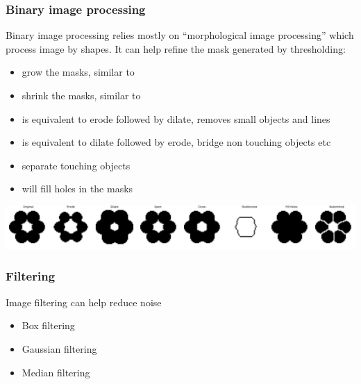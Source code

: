 \documentclass[ignorenonframetext,aspectratio=169,10pt,xcolor=table]{beamer}
\begin{document}
\begin{frame} \frametitle{Binary image processing} Binary image
  processing relies mostly on ``morphological image processing'' which
  process image by shapes. It can help refine the mask generated by
  thresholding:
  \begin{itemize}
  \item {} grow the masks, similar to
  \item {} shrink the masks, similar to
  \item {} is equivalent to erode followed by
    dilate, removes small objects and lines
  \item {} is equivalent to dilate followed
    by erode, bridge non touching objects etc
  \item {} separate touching objects
  \item {} will fill holes in the masks
  \end{itemize}
  \begin{center} \includegraphics[width=\textwidth]{flower}
  \end{center}
\end{frame}

\begin{frame} \frametitle{Filtering} Image filtering can help reduce
  noise
  \begin{itemize}
  \item Box filtering 
  \item Gaussian filtering 
  \item Median filtering 
  \end{itemize}

\end{frame}
\end{document}
